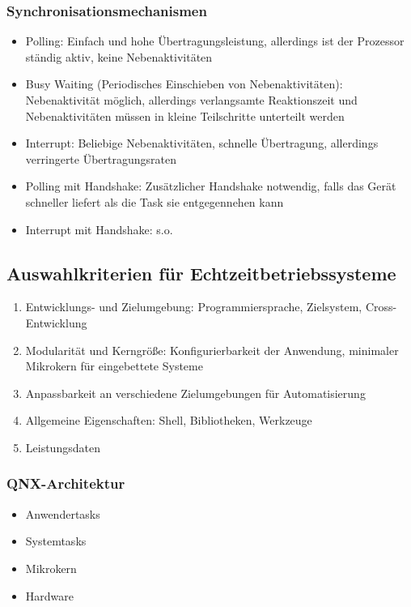 \subsubsection{Synchronisationsmechanismen}
\begin{itemize}
	\item Polling: Einfach und hohe Übertragungsleistung, allerdings ist der Prozessor ständig aktiv, keine Nebenaktivitäten
	\item Busy Waiting (Periodisches Einschieben von Nebenaktivitäten): Nebenaktivität möglich, allerdings verlangsamte Reaktionszeit und Nebenaktivitäten müssen in kleine Teilschritte unterteilt werden
	\item Interrupt: Beliebige Nebenaktivitäten, schnelle Übertragung, allerdings verringerte Übertragungsraten
	\item Polling mit Handshake: Zusätzlicher Handshake notwendig, falls das Gerät schneller liefert als die Task sie entgegennehen kann
	\item Interrupt mit Handshake: s.o.
\end{itemize}


\subsection{Auswahlkriterien für Echtzeitbetriebssysteme}
\begin{enumerate}
	\item Entwicklungs- und Zielumgebung: Programmiersprache, Zielsystem, Cross-Entwicklung
	\item Modularität und Kerngröße: Konfigurierbarkeit der Anwendung, minimaler Mikrokern für eingebettete Systeme
	\item Anpassbarkeit an verschiedene Zielumgebungen für Automatisierung
	\item Allgemeine Eigenschaften: Shell, Bibliotheken, Werkzeuge
	\item Leistungsdaten
\end{enumerate}

\subsubsection{QNX-Architektur}
\begin{itemize}
	\item Anwendertasks
	\item Systemtasks
	\item Mikrokern
	\item Hardware
\end{itemize}

